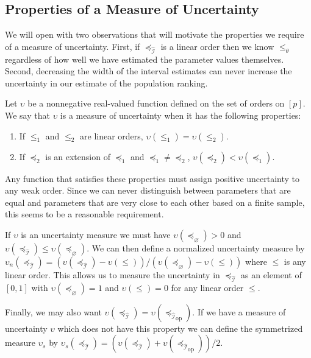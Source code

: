 \documentclass[12pt]{article}
\newcommand{\dual}[1]{#1_{\operatorname{op}}}
\newcommand{\eord}{{\preceq_{\varnothing}}}
\newcommand{\iord}{{\preceq_{\hat{\mathcal{I}}}}}
\newcommand{\pord}{{\leqslant_{\theta}}}
\numberwithin{theorem}{section}
\begin{document}
\subsection{Properties of a Measure of Uncertainty}
\label{subsec_uncert_quant_prop}

We will open with two observations that will motivate the properties we require of a measure of uncertainty.  First, if $\iord$ is a linear order then we know $\pord$ regardless of how well we have estimated the parameter values themselves.  Second, decreasing the width of the interval estimates can never increase the uncertainty in our estimate of the population ranking.

Let $\upsilon$ be a nonnegative real-valued function defined on the set of orders on $[p]$.  We say that $\upsilon$ is a measure of uncertainty when it has the following properties:

\begin{enumerate}

\item\label{cond_uncert_lin} If $\leqslant_1$ and $\leqslant_2$ are linear orders, $\upsilon(\leqslant_1) = \upsilon(\leqslant_2)$.

\item\label{cond_uncert_ext} If $\preceq_2$ is an extension of $\preceq_1$ and $\preceq_1 \neq \preceq_2$, $\upsilon(\preceq_2) < \upsilon(\preceq_1)$.

\end{enumerate}

\noindent
Any function that satisfies these properties must assign positive uncertainty to any weak order.  Since we can never distinguish between parameters that are equal and parameters that are very close to each other based on a finite sample, this seems to be a reasonable requirement.

If $\upsilon$ is an uncertainty measure we must have $\upsilon(\eord) > 0$ and $\upsilon(\iord) \leq \upsilon(\eord)$.  We can then define a normalized uncertainty measure by $\upsilon_n(\iord) = (\upsilon(\iord) - \upsilon(\leqslant)) / (\upsilon(\eord) - \upsilon(\leqslant))$ where $\leqslant$ is any linear order.  This allows us to measure the uncertainty in $\iord$ as an element of $[0, 1]$ with $\upsilon(\eord) = 1$ and $\upsilon(\leqslant) = 0$ for any linear order $\leqslant$.

Finally, we may also want $\upsilon(\iord) = \upsilon(\dual{\iord})$.  If we have a measure of uncertainty $\upsilon$ which does not have this property we can define the symmetrized measure $\upsilon_s$ by $\upsilon_s(\iord) = (\upsilon(\iord) + \upsilon(\dual{\iord}))/2$.
\end{document}
